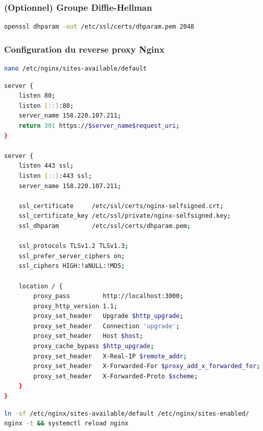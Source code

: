 \documentclass[11pt,a4paper,oneside]{report}
\begin{document}
\subsubsection{(Optionnel) Groupe Diffie-Hellman}
\begin{lstlisting}[language=bash,caption={G\'{e}n\'{e}ration des cl\'{e}s Diffie-Hellman (renforce la s\'{e}curit\'{e})},captionpos=b]
openssl dhparam -out /etc/ssl/certs/dhparam.pem 2048
\end{lstlisting}

\subsubsection{Configuration du reverse proxy Nginx}
\begin{lstlisting}[language=bash,caption={Ouverture du fichier de configuration Nginx},captionpos=b]
nano /etc/nginx/sites-available/default
\end{lstlisting}
\begin{lstlisting}[language=bash,caption={Configuration Nginx (proxy TLS vers backend)},captionpos=b]
server {
    listen 80;
    listen [::]:80;
    server_name 158.220.107.211;
    return 301 https://$server_name$request_uri;
}

server {
    listen 443 ssl;
    listen [::]:443 ssl;
    server_name 158.220.107.211;

    ssl_certificate     /etc/ssl/certs/nginx-selfsigned.crt;
    ssl_certificate_key /etc/ssl/private/nginx-selfsigned.key;
    ssl_dhparam         /etc/ssl/certs/dhparam.pem;

    ssl_protocols TLSv1.2 TLSv1.3;
    ssl_prefer_server_ciphers on;
    ssl_ciphers HIGH:!aNULL:!MD5;

    location / {
        proxy_pass         http://localhost:3000;
        proxy_http_version 1.1;
        proxy_set_header   Upgrade $http_upgrade;
        proxy_set_header   Connection 'upgrade';
        proxy_set_header   Host $host;
        proxy_cache_bypass $http_upgrade;
        proxy_set_header   X-Real-IP $remote_addr;
        proxy_set_header   X-Forwarded-For $proxy_add_x_forwarded_for;
        proxy_set_header   X-Forwarded-Proto $scheme;
    }
}
\end{lstlisting}
\begin{lstlisting}[language=bash,caption={Activation de la configuration},captionpos=b]
ln -sf /etc/nginx/sites-available/default /etc/nginx/sites-enabled/
nginx -t && systemctl reload nginx
\end{lstlisting}
\end{document}
